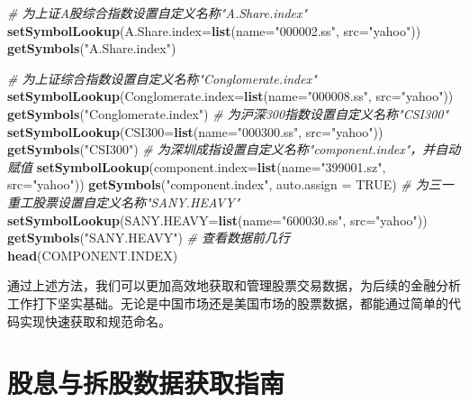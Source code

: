 \documentclass[]{ctexbook}
\newenvironment{Shaded}{\begin{snugshade}}{\end{snugshade}}
\newcommand{\AttributeTok}[1]{\textcolor[rgb]{0.13,0.29,0.53}{#1}}
\newcommand{\CommentTok}[1]{\textcolor[rgb]{0.56,0.35,0.01}{\textit{#1}}}
\newcommand{\ConstantTok}[1]{\textcolor[rgb]{0.56,0.35,0.01}{#1}}
\newcommand{\FunctionTok}[1]{\textcolor[rgb]{0.13,0.29,0.53}{\textbf{#1}}}
\newcommand{\NormalTok}[1]{#1}
\newcommand{\StringTok}[1]{\textcolor[rgb]{0.31,0.60,0.02}{#1}}
\begin{document}
\begin{Shaded}
\begin{Highlighting}[]
\CommentTok{\# 为上证A股综合指数设置自定义名称"A.Share.index"}
\FunctionTok{setSymbolLookup}\NormalTok{(}\AttributeTok{A.Share.index=}\FunctionTok{list}\NormalTok{(}\AttributeTok{name=}\StringTok{"000002.ss"}\NormalTok{, }\AttributeTok{src=}\StringTok{"yahoo"}\NormalTok{))}
\FunctionTok{getSymbols}\NormalTok{(}\StringTok{"A.Share.index"}\NormalTok{)}

\CommentTok{\# 为上证综合指数设置自定义名称"Conglomerate.index"}
\FunctionTok{setSymbolLookup}\NormalTok{(}\AttributeTok{Conglomerate.index=}\FunctionTok{list}\NormalTok{(}\AttributeTok{name=}\StringTok{"000008.ss"}\NormalTok{, }\AttributeTok{src=}\StringTok{"yahoo"}\NormalTok{))}
\FunctionTok{getSymbols}\NormalTok{(}\StringTok{"Conglomerate.index"}\NormalTok{)}
\CommentTok{\# 为沪深300指数设置自定义名称"CSI300"}
\FunctionTok{setSymbolLookup}\NormalTok{(}\AttributeTok{CSI300=}\FunctionTok{list}\NormalTok{(}\AttributeTok{name=}\StringTok{"000300.ss"}\NormalTok{, }\AttributeTok{src=}\StringTok{"yahoo"}\NormalTok{))}
\FunctionTok{getSymbols}\NormalTok{(}\StringTok{"CSI300"}\NormalTok{)}
\CommentTok{\# 为深圳成指设置自定义名称"component.index"，并自动赋值}
\FunctionTok{setSymbolLookup}\NormalTok{(}\AttributeTok{component.index=}\FunctionTok{list}\NormalTok{(}\AttributeTok{name=}\StringTok{"399001.sz"}\NormalTok{, }\AttributeTok{src=}\StringTok{"yahoo"}\NormalTok{))}
\FunctionTok{getSymbols}\NormalTok{(}\StringTok{"component.index"}\NormalTok{, }\AttributeTok{auto.assign =} \ConstantTok{TRUE}\NormalTok{)}
\CommentTok{\# 为三一重工股票设置自定义名称"SANY.HEAVY"}
\FunctionTok{setSymbolLookup}\NormalTok{(}\AttributeTok{SANY.HEAVY=}\FunctionTok{list}\NormalTok{(}\AttributeTok{name=}\StringTok{"600030.ss"}\NormalTok{, }\AttributeTok{src=}\StringTok{"yahoo"}\NormalTok{))}
\FunctionTok{getSymbols}\NormalTok{(}\StringTok{"SANY.HEAVY"}\NormalTok{)}
\CommentTok{\# 查看数据前几行}
\FunctionTok{head}\NormalTok{(COMPONENT.INDEX)}
\end{Highlighting}
\end{Shaded}

通过上述方法，我们可以更加高效地获取和管理股票交易数据，为后续的金融分析工作打下坚实基础。无论是中国市场还是美国市场的股票数据，都能通过简单的代码实现快速获取和规范命名。

\section{股息与拆股数据获取指南}\label{ux80a1ux606fux4e0eux62c6ux80a1ux6570ux636eux83b7ux53d6ux6307ux5357}
\end{document}
